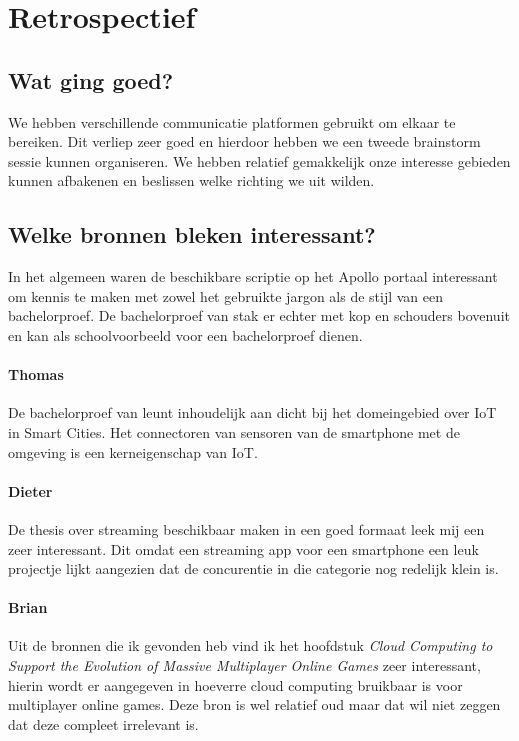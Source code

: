 \documentclass[fleqn,10pt]{voorstel}
\begin{document}
\section{Retrospectief}
\subsection{Wat ging goed?}
We hebben verschillende communicatie platformen gebruikt om elkaar te bereiken. Dit verliep zeer goed en hierdoor hebben we een tweede brainstorm sessie kunnen organiseren.
We hebben relatief gemakkelijk onze interesse gebieden kunnen afbakenen en beslissen welke richting we uit wilden.

\subsection{Welke bronnen bleken interessant?}
In het algemeen waren de beschikbare scriptie op het Apollo portaal interessant om kennis te maken met zowel het gebruikte jargon als de stijl van een bachelorproef. De bachelorproef van \cite{VanderPlaetsen2013} stak er echter met kop en schouders bovenuit en kan als schoolvoorbeeld voor een bachelorproef dienen.

\paragraph{Thomas}De bachelorproef van \cite{VanderPlaetsen2013} leunt inhoudelijk aan dicht bij het domeingebied over IoT in Smart Cities. Het connectoren van sensoren van de smartphone met de omgeving is een kerneigenschap van IoT.

\paragraph{Dieter}De thesis \cite{CosmanAlexander2011} over streaming beschikbaar maken in een goed formaat leek mij een zeer interessant. Dit omdat een streaming app voor een smartphone een leuk projectje lijkt aangezien dat de concurentie in die categorie nog redelijk klein is.

\paragraph{Brian}Uit de bronnen die ik gevonden heb vind ik het hoofdstuk \textit{Cloud Computing to Support the Evolution of Massive Multiplayer Online Games} \citep{Maggiorini2011} zeer interessant, hierin wordt er aangegeven in hoeverre cloud computing bruikbaar is voor multiplayer online games. Deze bron is wel relatief oud maar dat wil niet zeggen dat deze compleet irrelevant is.
\end{document}
